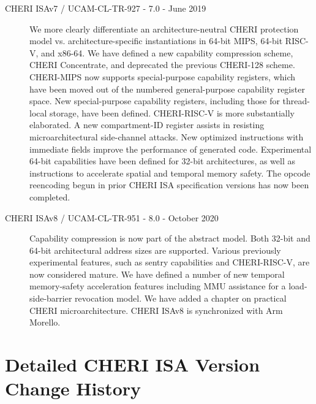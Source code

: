 \begin{description}
\item[CHERI ISAv7 / UCAM-CL-TR-927 - 7.0 - June 2019]
  We more clearly differentiate an archi\-tecture-neutral CHERI protection
  model vs. architecture-specific instantiations in 64-bit MIPS, 64-bit
  RISC-V, and x86-64.
  We have defined a new capability compression scheme, CHERI Concentrate, and
  deprecated the previous CHERI-128 scheme.
  CHERI-MIPS now supports special-purpose capability registers, which have
  been moved out of the numbered general-purpose capability register space.
  New special-purpose capability registers, including those for thread-local
  storage, have been defined.
  CHERI-RISC-V is more substantially elaborated.
  A new compartment-ID register assists in resisting microarchitectural
  side-channel attacks.
  New optimized instructions with immediate fields improve the performance of
  generated code.
  Experimental 64-bit capabilities have been defined for 32-bit architectures,
  as well as instructions to accelerate spatial and temporal memory safety.
  The opcode reencoding begun in prior CHERI ISA specification versions has
  now been completed.

\item[CHERI ISAv8 / UCAM-CL-TR-951 - 8.0 - October 2020]
  Capability compression is now part of the abstract model.
  Both 32-bit and 64-bit architectural address sizes are supported.
  Various previously experimental features, such as sentry capabilities and
  CHERI-RISC-V, are now considered mature. We have defined a number of new
  temporal memory-safety acceleration features including MMU assistance for a
  load-side-barrier revocation model.
  We have added a chapter on practical CHERI microarchitecture.
  CHERI ISAv8 is synchronized with Arm Morello.

\end{description}

\section{Detailed CHERI ISA Version Change History}
\label{sec:detailed-cheri-isa-version-change-history}

